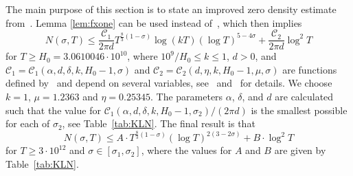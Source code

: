 \documentclass[a4paper,reqno]{amsart}
\theoremstyle{definition}
\begin{document}
The main purpose of this section is to state an improved zero density estimate from~\cite{KADIRI201822}. Lemma \ref{lem:fxone} can be used instead of~\cite[Lemma~4.3]{KADIRI201822}, which then implies
\[
N(\sigma,T) \leq \frac{\mathcal{C}_{1}}{ 2 \pi d}T^{\frac{8}{3}\left(1-\sigma\right)}  \log (kT)\left(\log{T}\right)^{5-4\sigma}  + \frac{\mathcal{C}_{2}}{2 \pi d}\log^{2}{T} 
\]
for $T\geq H_0=3.0610046\cdot10^{10}$, where $10^9/H_0\leq k\leq 1$, $d>0$, and $\mathcal{C}_{1}=\mathcal{C}_{1}\left(\alpha,d,\delta,k,H_0-1,\sigma\right)$ and $\mathcal{C}_{2}=\mathcal{C}_{2}\left(d,\eta,k,H_0-1,\mu,\sigma\right)$ are functions defined by~\cite[Equations~(4.72) and~(4.73)]{KADIRI201822} and depend on several variables, see~\cite[Lemma~4.14]{KADIRI201822} and~\cite[pp.~1223--1224]{CullyJohnstonRvM} for details. We choose $k=1$, $\mu=1.2363$ and $\eta=0.25345$. The parameters $\alpha$, $\delta$, and $d$ are calculated such that the value for $\mathcal{C}_1\left(\alpha,d,\delta,k,H_0-1,\sigma_2\right)/(2\pi d)$ is the smallest possible for each of $\sigma_2$, see Table~\ref{tab:KLN}. The final result is that
\begin{equation}
\label{eq:KLN}
N(\sigma,T) \leq A\cdot T^{\frac{8}{3}\left(1-\sigma\right)}\left(\log{T}\right)^{2(3-2\sigma)}  + B\cdot\log^{2}{T}
\end{equation}
for $T\geq 3\cdot10^{12}$ and $\sigma\in[\sigma_1,\sigma_2]$, where the values for $A$ and $B$ are given by Table~\ref{tab:KLN}.
\end{document}
